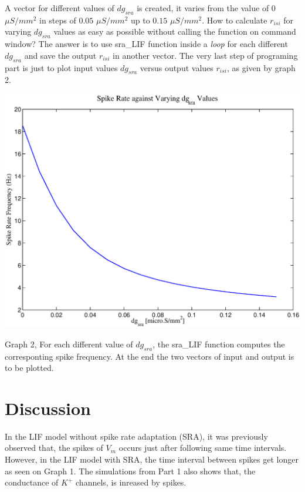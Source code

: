 \documentclass{article}
\begin{document}
A vector for different values of $dg_{sra}$ is created, it varies from the value of $0$ $\mu S/mm^2$ in steps of $0.05$ $\mu S/mm^2$  up to $0.15$ $\mu S/mm^2$. How to calculate $r_{isi}$ for varying $dg_{sra}$ values as easy as possible without calling the function  on command window? The answer is to use sra\_LIF function inside a \textit{loop} for each different $dg_{sra}$ and save the output $r_{isi}$ in another vector. The very last step of programing part is just to plot input values $dg_{sra}$ versus output values $r_{isi}$, as given by graph 2.

\begin{center}
 \includegraphics[width=\textwidth]{fig2.eps}
\begin{footnotesize}Graph 2, For each different value of $dg_{sra}$, the sra\_LIF function computes the corresponting spike frequency. At the end the two vectors of input and output is to be plotted. \end{footnotesize}
\end{center}


\section*{Discussion} 

In the LIF model without spike rate adaptation (SRA), it was previously observed that, the spikes of $V_{m}$ occurs just after following same time intervals. However, in the LIF model with SRA, the time interval between spikes get longer as seen on Graph 1. The simulations from Part 1 also shows that, the conductance of $K^{+}$ channels, is inreased by spikes.\\
\end{document}
